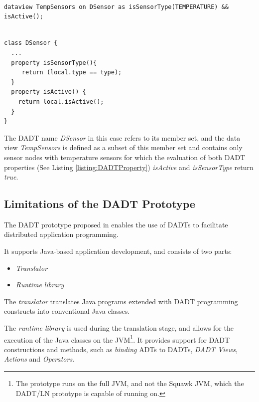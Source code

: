 \begin{lstlisting}[frame=trbl, basewidth={0.55em, 0.6em}, captionpos=b, 
basicstyle=\ttfamily\footnotesize, breaklines, caption = Definition of DADT Data View, label = listing:DADTview ]  

dataview TempSensors on DSensor as isSensorType(TEMPERATURE) && isActive(); 
\end{lstlisting}

\begin{lstlisting}[frame=trbl, basewidth={0.55em, 0.6em}, captionpos=b, 
basicstyle=\ttfamily\footnotesize, breaklines, caption = Definition of DADT Properties, label = listing:DADTProperty ]  

class DSensor {
  ...
  property isSensorType(){
	 return (local.type == type);
  }
  property isActive() {
	return local.isActive();
  }
}

\end{lstlisting}

The DADT name \emph{DSensor} in this case refers to its member set, and 
the data view \emph{TempSensors} is defined as a subset of this member set and
contains only sensor nodes with temperature sensors for which the evaluation of
both DADT properties (See Listing \ref{listing:DADTProperty}) \emph{isActive}
and \emph{isSensorType} return \emph{true}. 

\subsection{Limitations of the DADT Prototype}

The DADT prototype proposed in \cite{migliavacca_DADT:2006} enables the use of
DADTs to facilitate distributed application programming.

It supports Java-based application development, and consists of two parts:
\begin{itemize}
  \item \emph{Translator}
  \item \emph{Runtime library} 
\end{itemize}

The \emph{translator} translates Java programs
  extended with DADT programming constructs into conventional Java classes.

The \emph{runtime library} is used during the translation stage, and allows for the execution of the Java classes on the JVM\footnote{The prototype runs on the full JVM, and not the Squawk JVM, which the DADT/LN prototype is capable of running on.}. It provides support for DADT constructions and methods, such as
\emph{binding} ADTs to DADTs, \emph{DADT Views}, \emph{Actions} and
\emph{Operators}. 

